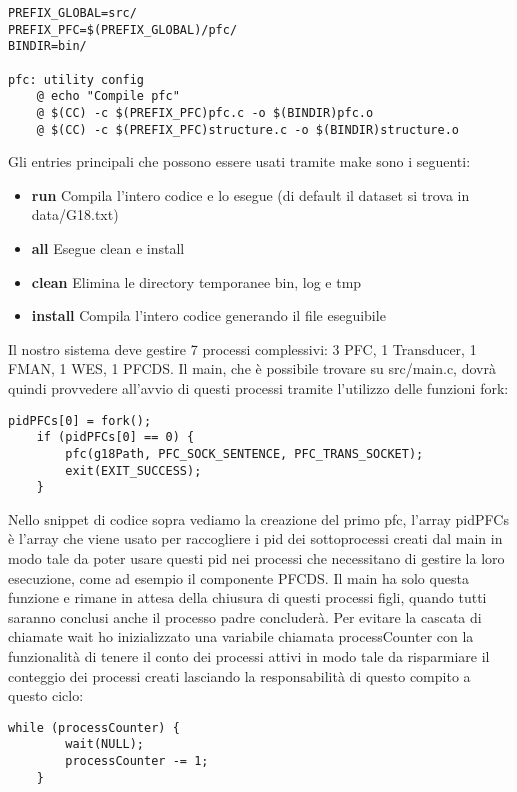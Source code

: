 \documentclass{article}
\begin{document}
\begin{flushleft}
\begin{lstlisting}[frame=single]
PREFIX_GLOBAL=src/
PREFIX_PFC=$(PREFIX_GLOBAL)/pfc/
BINDIR=bin/

pfc: utility config 
	@ echo "Compile pfc"
	@ $(CC) -c $(PREFIX_PFC)pfc.c -o $(BINDIR)pfc.o
	@ $(CC) -c $(PREFIX_PFC)structure.c -o $(BINDIR)structure.o
\end{lstlisting}

Gli entries principali che possono essere usati tramite make sono i seguenti:

\begin{itemize}
    \item \textbf{run} Compila l'intero codice e lo esegue (di default il dataset si trova in data/G18.txt)
    \item \textbf{all} Esegue clean e install
    \item \textbf{clean} Elimina le directory temporanee bin, log e tmp
    \item \textbf{install} Compila l'intero codice generando il file eseguibile
\end{itemize}

Il nostro sistema deve gestire 7 processi complessivi: 3 PFC, 1 Transducer, 1 FMAN, 1 WES, 1 PFCDS. Il main, che è possibile trovare su src/main.c, dovrà quindi provvedere all'avvio di questi processi tramite l'utilizzo delle funzioni fork:

\begin{lstlisting}[frame=single]
    pidPFCs[0] = fork();
    if (pidPFCs[0] == 0) {
        pfc(g18Path, PFC_SOCK_SENTENCE, PFC_TRANS_SOCKET);
        exit(EXIT_SUCCESS);
    }
\end{lstlisting}

Nello snippet di codice sopra vediamo la creazione del primo pfc, l'array pidPFCs è l'array che viene usato per raccogliere i pid dei sottoprocessi creati dal main in modo tale da poter usare questi pid nei processi che necessitano di gestire la loro esecuzione, come ad esempio il componente PFCDS. Il main ha solo questa funzione e rimane in attesa della chiusura di questi processi figli, quando tutti saranno conclusi anche il processo padre concluderà. Per evitare la cascata di chiamate wait ho inizializzato una variabile chiamata processCounter con la funzionalità di tenere il conto dei processi attivi in modo tale da risparmiare il conteggio dei processi creati lasciando la responsabilità di questo compito a questo ciclo:

\begin{lstlisting}[frame=single]
    while (processCounter) {
        wait(NULL);
        processCounter -= 1;
    }
\end{lstlisting}


\end{flushleft}
\end{document}
